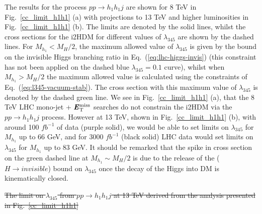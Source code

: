 \documentclass[12pt,a4paper]{article}
\newcommand{\MET}{\textbf{\textit{E}$_{\rm T}^{\rm miss}$}}
\providecommand{\DIFdeltex}[1]{{\protect\color{red}\sout{#1}}}                      %
\providecommand{\DIFdelbegin}{} %
\providecommand{\DIFdelend}{} %
\providecommand{\DIFdel}[1]{\texorpdfstring{\DIFdeltex{#1}}{}} %
\begin{document}
The results for the process $pp\rightarrow h_1h_1 j$ are shown for 8 TeV in Fig.~\ref{cc_limit_h1h1} (a) with projections to 13 TeV and higher luminosities in Fig.~\ref{cc_limit_h1h1} (b). The limits are denoted by the solid lines, whilst the cross sections for the i2HDM for different values of $\lambda_{345}$ are shown by the dashed lines. For $M_{h_1} < M_H/2$, the maximum allowed value of $\lambda_{345}$ is given by the bound on the invisible Higgs branching ratio in Eq.~(\ref{eq:lhc-higgs-invis}) (this constraint has not been applied on the dashed blue $\lambda_{345} = 0.1$ curve), whilst when $M_{h_1} > M_H/2$ the maximum allowed value is calculated using the constraints of Eq.~(\ref{eq:l345-vacuum-stab}). The cross section with this maximum value of $\lambda_{345}$ is denoted by the dashed green line. We see in Fig.~\ref{cc_limit_h1h1} (a), that the 8 TeV LHC mono-jet + $\MET{}$ searches do not constrain the i2HDM via the $pp\rightarrow h_1h_1 j$ process. However at 13 TeV, shown in Fig.~\ref{cc_limit_h1h1} (b), with around 100 $fb^{-1}$ of data (purple solid), we would be able to set limits on $\lambda_{345}$ for $M_{h_1}$ up to 66 GeV, and for 3000 $fb^{-1} $ (black solid) LHC data would set limits on $\lambda_{345}$ for $M_{h_1}$ up to 83 GeV. 
It should be remarked that the spike in cross section on the green dashed line at $M_{h_1} \sim M_H/2$ is due to the release of the ($H \to invisible$) bound on $\lambda_{345}$ once the decay of the Higgs into DM is kinematically closed.

\DIFdelbegin %
{%
\DIFdel{The limit on $\lambda_{345}$ from  $pp \to h_1 h_1 j$ at 13 TeV
derived from the analysis presented in Fig.~\ref{cc_limit_h1h1} }%
}
\DIFdelend 
\end{document}
